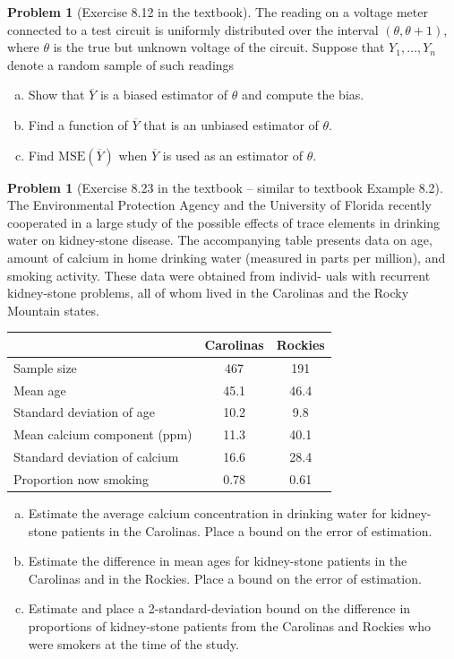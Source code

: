 \documentclass[10pt]{article}
\theoremstyle{definition}
\newtheorem{problem}[theorem]{Problem}
\newcommand{\1}[1]{\textbf{1}_{\left[#1\right]}} %
\begin{document}
\begin{problem}[Exercise 8.12 in the textbook]
  The reading on a voltage meter connected to a test circuit is uniformly
  distributed over the interval $(\theta,\theta+1)$, where $\theta$ is the
  true but unknown voltage of the circuit. Suppose that $Y_{1},\ldots,Y_{n}$
  denote a random sample of such readings
  \begin{enumerate}[(a)]
    \item Show that $\overline{Y}$ is a biased estimator of $\theta$ and
    compute the bias.
    \item Find a function of $\overline{Y}$ that is an unbiased estimator of
    $\theta$. 
    \item Find $\text{MSE}(\overline{Y})$ when $\overline{Y}$ is used as an
    estimator of $\theta$. 
  \end{enumerate}
\end{problem}

\begin{problem}[Exercise 8.23 in the textbook -- similar to textbook Example 8.2]
  The Environmental Protection Agency and the University of Florida recently
  cooperated in a large study of the possible effects of trace elements in
  drinking water on kidney-stone disease. The accompanying table presents data
  on age, amount of calcium in home drinking water (measured in parts per
  million), and smoking activity. These data were obtained from individ- uals
  with recurrent kidney-stone problems, all of whom lived in the Carolinas and
  the Rocky Mountain states.

  \begin{table}[h]
    \centering
    \begin{tabular}{lcc}
      \hline
      & Carolinas & Rockies \\
      \hline
      Sample size & 467 & 191 \\
      Mean age & 45.1 & 46.4 \\
      Standard deviation of age & 10.2 & 9.8 \\
      Mean calcium component (ppm) & 11.3 & 40.1 \\
      Standard deviation of calcium & 16.6 & 28.4 \\
      Proportion now smoking & 0.78 & 0.61 \\
      \hline
    \end{tabular}
  \end{table}
  \begin{enumerate}[(a)]
    \item Estimate the average calcium concentration in drinking water for kidney-stone patients in
    the Carolinas. Place a bound on the error of estimation.
    \item Estimate the difference in mean ages for kidney-stone patients in the Carolinas and in the
    Rockies. Place a bound on the error of estimation.
    \item Estimate and place a 2-standard-deviation bound on the difference in
    proportions of kidney-stone patients from the Carolinas and Rockies who were
    smokers at the time of the study.
  \end{enumerate}
\end{problem}
\end{document}
